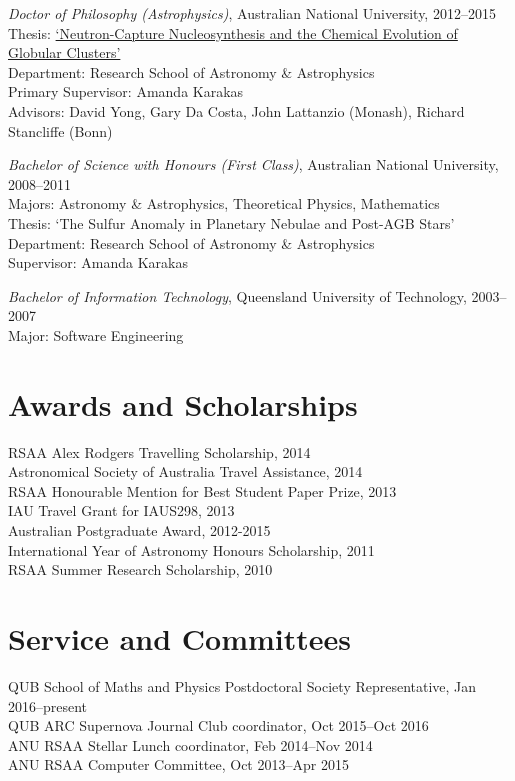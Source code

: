 \documentclass[11pt]{res} %
\begin{document}
\begin{resume}
  {\it Doctor of Philosophy (Astrophysics)}, Australian National University, 2012--2015\\
  Thesis: \href{https://openresearch-repository.anu.edu.au/handle/1885/16507}{`Neutron-Capture Nucleosynthesis and the Chemical Evolution of Globular Clusters'}\\
  Department: Research School of Astronomy \& Astrophysics\\
  Primary Supervisor: Amanda Karakas\\
  Advisors: David Yong, Gary Da Costa, John Lattanzio (Monash), Richard Stancliffe (Bonn)

  {\it Bachelor of Science with Honours (First Class)}, Australian National University, 2008--2011\\
  Majors: Astronomy \& Astrophysics, Theoretical Physics, Mathematics\\
  Thesis: `The Sulfur Anomaly in Planetary Nebulae and Post-AGB Stars'\\
  Department: Research School of Astronomy \& Astrophysics\\
  Supervisor: Amanda Karakas


  {\it Bachelor of Information Technology}, Queensland University of Technology, 2003--2007\\
  Major: Software Engineering

\section{Awards and Scholarships}
  RSAA Alex Rodgers Travelling Scholarship, 2014\\
  Astronomical Society of Australia Travel Assistance, 2014\\
  RSAA Honourable Mention for Best Student Paper Prize, 2013\\
  IAU Travel Grant for IAUS298, 2013\\
  Australian Postgraduate Award, 2012-2015\\
  International Year of Astronomy Honours Scholarship, 2011\\
  RSAA Summer Research Scholarship, 2010

\section{Service and Committees}
	QUB School of Maths and Physics Postdoctoral Society Representative, Jan 2016--present\\
	QUB ARC Supernova Journal Club coordinator, Oct 2015--Oct 2016\\
	ANU RSAA Stellar Lunch coordinator, Feb 2014--Nov 2014\\
	ANU RSAA Computer Committee, Oct 2013--Apr 2015


\end{resume}
\end{document}
